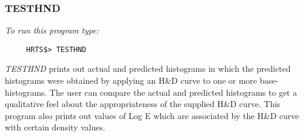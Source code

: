 \subsubsection{TESTHND}

{\em To run this program type:}
\begin{verbatim}
     HRTS$> TESTHND              
\end{verbatim}
{\em TESTHND} prints out actual and predicted histograms in which the
   predicted histograms were obtained by applying an H\&D curve to one or
   more base-histograms.  The user can compare the actual and predicted
   histograms to get a qualitative feel about the appropriateness of the
   supplied H\&D curve.  This program also prints out values of Log E which
   are associated by the H\&D curve with certain density values.

